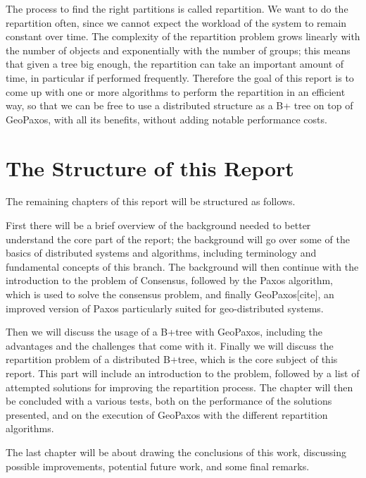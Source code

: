 The process to find the right partitions is called repartition. We want to do the repartition often, since we cannot expect the workload of the system to remain constant over time. The complexity of the repartition problem grows linearly with the number of objects and exponentially with the number of groups; this means that given a tree big enough, the repartition can take an important amount of time, in particular if performed frequently. Therefore the goal of this report is to come up with one or more algorithms to perform the repartition in an efficient way, so that we can be free to use a distributed structure as a B+ tree on top of GeoPaxos, with all its benefits, without adding notable performance costs.

\section{The Structure of this Report}\label{the-structure-of-this-report}
The remaining chapters of this report will be structured as follows.

First there will be a brief overview of the background needed to better understand the core part of the report; the background will go over some of the basics of distributed systems and algorithms, including terminology and fundamental concepts of this branch. The background will then continue with the introduction to the problem of Consensus, followed by the Paxos algorithm, which is used to solve the consensus problem, and finally GeoPaxos[cite], an improved version of Paxos particularly suited for geo-distributed systems. 

Then we will discuss the usage of a B+tree with GeoPaxos, including the advantages and the challenges that come with it. Finally we will discuss the repartition problem of a distributed B+tree, which is the core subject of this report. This part will include an introduction to the problem, followed by a list of attempted solutions for improving the repartition process. The chapter will then be concluded with a various tests, both on the performance of the solutions presented, and on the execution of GeoPaxos with the different repartition algorithms.

The last chapter will be about drawing the conclusions of this work, discussing possible improvements, potential future work, and some final remarks.